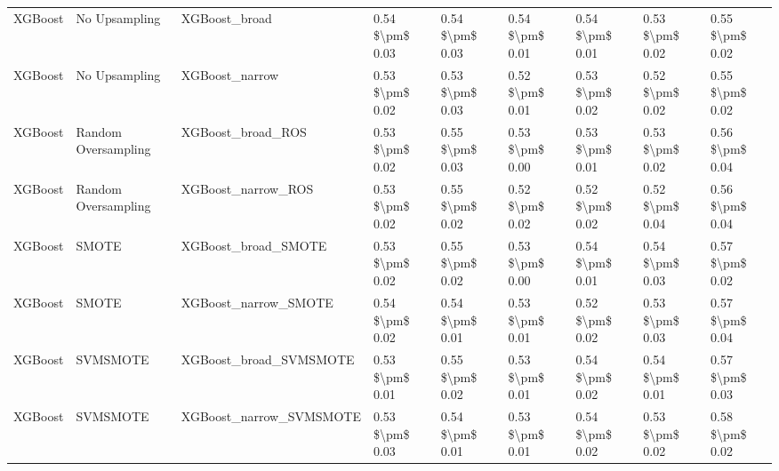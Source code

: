 \begin{tabular}{lllllllll}
                        XGBoost &                 No Upsampling &                                XGBoost\_broad & 0.54 \$\textbackslash pm\$ 0.03 &           0.54 \$\textbackslash pm\$ 0.03 &       0.54 \$\textbackslash pm\$ 0.01 &        0.54 \$\textbackslash pm\$ 0.01 &                         0.53 \$\textbackslash pm\$ 0.02 &     0.55 \$\textbackslash pm\$ 0.02 \\
                        XGBoost &                 No Upsampling &                               XGBoost\_narrow & 0.53 \$\textbackslash pm\$ 0.02 &           0.53 \$\textbackslash pm\$ 0.03 &       0.52 \$\textbackslash pm\$ 0.01 &        0.53 \$\textbackslash pm\$ 0.02 &                         0.52 \$\textbackslash pm\$ 0.02 &     0.55 \$\textbackslash pm\$ 0.02 \\
                        XGBoost &           Random Oversampling &                            XGBoost\_broad\_ROS & 0.53 \$\textbackslash pm\$ 0.02 &           0.55 \$\textbackslash pm\$ 0.03 &       0.53 \$\textbackslash pm\$ 0.00 &        0.53 \$\textbackslash pm\$ 0.01 &                         0.53 \$\textbackslash pm\$ 0.02 &     0.56 \$\textbackslash pm\$ 0.04 \\
                        XGBoost &           Random Oversampling &                           XGBoost\_narrow\_ROS & 0.53 \$\textbackslash pm\$ 0.02 &           0.55 \$\textbackslash pm\$ 0.02 &       0.52 \$\textbackslash pm\$ 0.02 &        0.52 \$\textbackslash pm\$ 0.02 &                         0.52 \$\textbackslash pm\$ 0.04 &     0.56 \$\textbackslash pm\$ 0.04 \\
                        XGBoost &                         SMOTE &                          XGBoost\_broad\_SMOTE & 0.53 \$\textbackslash pm\$ 0.02 &           0.55 \$\textbackslash pm\$ 0.02 &       0.53 \$\textbackslash pm\$ 0.00 &        0.54 \$\textbackslash pm\$ 0.01 &                         0.54 \$\textbackslash pm\$ 0.03 &     0.57 \$\textbackslash pm\$ 0.02 \\
                        XGBoost &                         SMOTE &                         XGBoost\_narrow\_SMOTE & 0.54 \$\textbackslash pm\$ 0.02 &           0.54 \$\textbackslash pm\$ 0.01 &       0.53 \$\textbackslash pm\$ 0.01 &        0.52 \$\textbackslash pm\$ 0.02 &                         0.53 \$\textbackslash pm\$ 0.03 &     0.57 \$\textbackslash pm\$ 0.04 \\
                        XGBoost &                      SVMSMOTE &                       XGBoost\_broad\_SVMSMOTE & 0.53 \$\textbackslash pm\$ 0.01 &           0.55 \$\textbackslash pm\$ 0.02 &       0.53 \$\textbackslash pm\$ 0.01 &        0.54 \$\textbackslash pm\$ 0.02 &                         0.54 \$\textbackslash pm\$ 0.01 &     0.57 \$\textbackslash pm\$ 0.03 \\
                        XGBoost &                      SVMSMOTE &                      XGBoost\_narrow\_SVMSMOTE & 0.53 \$\textbackslash pm\$ 0.03 &           0.54 \$\textbackslash pm\$ 0.01 &       0.53 \$\textbackslash pm\$ 0.01 &        0.54 \$\textbackslash pm\$ 0.02 &                         0.53 \$\textbackslash pm\$ 0.02 &     0.58 \$\textbackslash pm\$ 0.02 \\
\bottomrule
\end{tabular}
